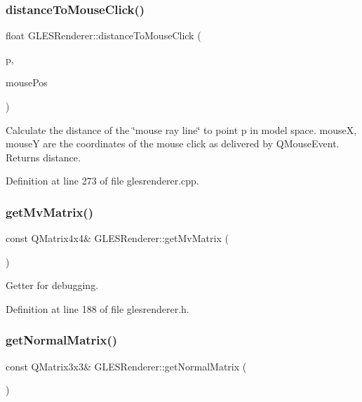 \subsubsection{\texorpdfstring{distanceToMouseClick()}{distanceToMouseClick()}}
{\footnotesize\ttfamily float G\+L\+E\+S\+Renderer\+::distance\+To\+Mouse\+Click (\begin{DoxyParamCaption}\item[{Q\+Vector3D}]{p,  }\item[{const Q\+Point \&}]{mouse\+Pos }\end{DoxyParamCaption})}

Calculate the distance of the \char`\"{}mouse ray line\char`\"{} to point p in model space. mouseX, mouseY are the coordinates of the mouse click as delivered by Q\+Mouse\+Event. Returns distance. 

Definition at line 273 of file glesrenderer.\+cpp.

\mbox{\label{class_g_l_e_s_renderer_af6f079ccbe2e37b90018dde13ad36b94}} 
\subsubsection{\texorpdfstring{getMvMatrix()}{getMvMatrix()}}
{\footnotesize\ttfamily const Q\+Matrix4x4\& G\+L\+E\+S\+Renderer\+::get\+Mv\+Matrix (\begin{DoxyParamCaption}{ }\end{DoxyParamCaption})\hspace{0.3cm}{\ttfamily [inline]}}

Getter for debugging. 

Definition at line 188 of file glesrenderer.\+h.

\mbox{\label{class_g_l_e_s_renderer_a0dfc680c7a7b2aea8439f88a892858fe}} 
\subsubsection{\texorpdfstring{getNormalMatrix()}{getNormalMatrix()}}
{\footnotesize\ttfamily const Q\+Matrix3x3\& G\+L\+E\+S\+Renderer\+::get\+Normal\+Matrix (\begin{DoxyParamCaption}{ }\end{DoxyParamCaption})\hspace{0.3cm}{\ttfamily [inline]}}


